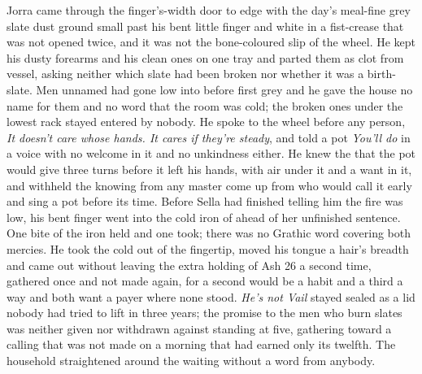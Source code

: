 Jorra came through the finger's-width door to  edge with the day's meal-fine grey slate dust ground small past his bent little finger and white in a fist-crease that was not opened twice, and it was not the bone-coloured slip of the wheel. He kept his dusty forearms and his clean ones on one tray and parted them as clot from vessel, asking neither which slate had been broken nor whether it was a birth-slate. Men unnamed had gone low into  before first grey and he gave the house no name for them and no word that the room was cold; the broken ones under the lowest rack stayed entered by nobody. He spoke to the wheel before any person, \emph{It doesn't care whose hands. It cares if they're steady}, and told a pot \emph{You'll do} in a voice with no welcome in it and no unkindness either. He knew the  that the pot would give three turns before it left his hands, with air under it and a want in it, and withheld the knowing from any master come up from  who would call it early and sing a pot before its time. Before Sella had finished telling him the fire was low, his bent finger went into the cold iron of  ahead of her unfinished sentence. One bite of the iron held and one took; there was no Grathic word covering both mercies. He took the cold out of the fingertip, moved his tongue a hair's breadth and came out without leaving the extra holding of Ash 26 a second time, gathered once and not made again, for a second would be a habit and a third a way and both want a payer where none stood. \emph{He's not Vail} stayed sealed as a lid nobody had tried to lift in three years; the promise to the men who burn slates was neither given nor withdrawn against  standing at five, gathering toward a calling that was not made on a morning that had earned only its twelfth. The household straightened around the waiting without a word from anybody.

